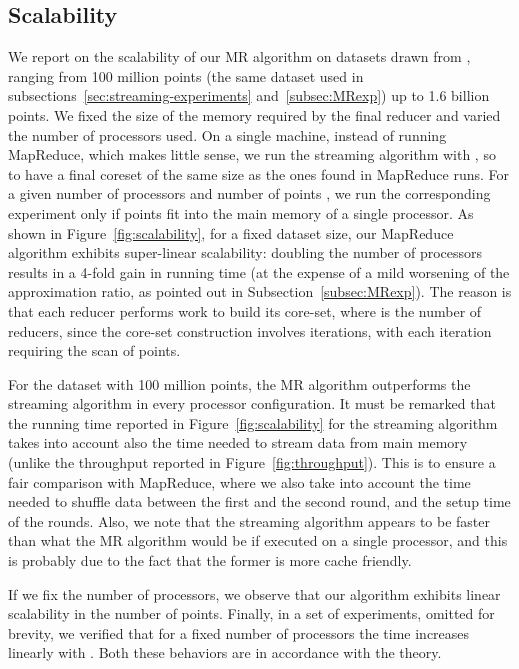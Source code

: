 \documentclass{article}
\begin{document}
\subsection{Scalability}

We report on the scalability of our MR algorithm on datasets drawn
from , ranging from 100 million points (the same dataset
used in subsections~\ref{sec:streaming-experiments}
and~\ref{subsec:MRexp}) up to 1.6 billion points.
We fixed the size  of the memory required by the final reducer and varied the number of processors used.
On a single machine, instead of running MapReduce, which makes little sense, we run the streaming algorithm with , so to have a final coreset of the same size as the ones found in MapReduce runs.
For a given number of processors  and number of points , we run the corresponding experiment only if  points fit into the main memory of a single processor.
As shown in Figure~\ref{fig:scalability}, for a fixed dataset size,
our MapReduce algorithm exhibits super-linear scalability: doubling the number of processors results in a 4-fold gain in running time (at the expense of a mild worsening of the approximation ratio, as pointed out in Subsection~\ref{subsec:MRexp}).
The reason is that each reducer performs  work to
build its core-set, where  is the number of reducers, since the
core-set construction involves  iterations, with each
iteration requiring the scan of  points.

For the dataset with 100 million points, the MR algorithm outperforms
the streaming algorithm in every processor configuration. It must be
remarked that the running time reported in
Figure~\ref{fig:scalability} for the streaming algorithm takes into
account also the time needed to stream data from main memory (unlike
the throughput reported in Figure~\ref{fig:throughput}). This is to
ensure a fair comparison with MapReduce, where we also take into
account the time needed to shuffle data between the first and the
second round, and the setup time of the rounds.  Also, we
note that the streaming algorithm appears to be faster than what the
MR algorithm would be if executed on a single processor, and this is
probably due to the fact that the former is more cache
friendly.

If we fix the number of processors, we observe that our algorithm
exhibits linear scalability in the number of points.
Finally, in a set of experiments, omitted for brevity, we
verified that for a fixed number of processors the
time increases linearly with . Both these behaviors
are in accordance with the theory.
\end{document}
